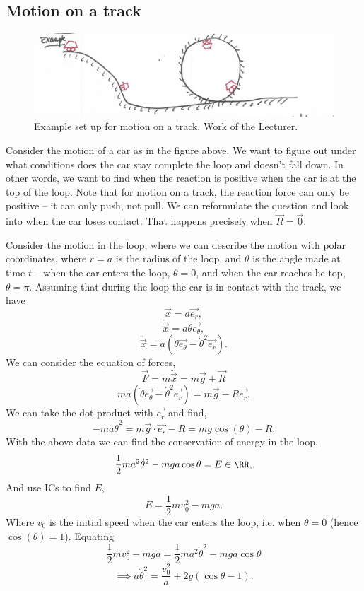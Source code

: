 \subsection{Motion on a track}
\begin{figure}[h]
  \centering
  \includegraphics[width=\textwidth]{media/lec9_example}
  \caption{Example set up for motion on a track. Work of the Lecturer.}
  \label{fig:lec9_track_example}
\end{figure}
Consider the motion of a car as in the figure above. We want to figure out under
what conditions does the car stay complete the loop and doesn't fall down. In
other words, we want to find when the reaction is positive when the car is at
the top of the loop. Note that for motion on a track, the reaction force can
only be positive -- it can only push, not pull. We can reformulate the question
and look into when the car loses contact. That happens precisely when
$\vec{R}=\vec{0}$.

Consider the motion in the loop, where we can describe the motion with polar
coordinates, where $r=a$ is the radius of the loop, and $\theta$ is the angle
made at time $t$ -- when the car enters the loop, $\theta=0$, and when the car
reaches he top, $\theta=\pi$. Assuming that during the loop the car is in
contact with the track, we have 
\[\vec{x}=a\vec{e_r},\]
\[\dot{\vec{x}}=a\dot{\theta}\vec{e_{\theta}},\]
\[\ddot{\vec{x}} = a(\ddot{\theta}\vec{e_{\theta}} - \dot{\theta}^2\vec{e_r}).\]
We can consider the equation of forces,
\[\vec{F}=m\ddot{\vec{x}} = m\vec{g}+\vec{R}\]
\[ma(\ddot{\theta}\vec{e_{\theta}} - \dot{\theta}^2\vec{e_r})=
m\vec{g}-R\vec{e_r}.\]
We can take the dot product with $\vec{e_r}$ and find, 
\[-ma\dot{\theta}^2 = m\vec{g}\cdot\vec{e_r} - R=mg\cos(\theta) - R.\]
With the above data we can find the conservation of energy in the loop,
\[\frac{1}{2}ma^2\dot{\theta}^2 - mga\cos\theta = E\in\RR,\]
And use ICs to find $E$,
\[E=\frac{1}{2}mv_0^2 - mga.\]
Where $v_0$ is the initial speed when the car enters the loop, i.e. when
$\theta=0$ (hence $\cos(\theta)=1$). Equating
\[\frac{1}{2}mv_0^2 - mga = \frac{1}{2}ma^2\dot{\theta}^2 - mga\cos\theta\]
\begin{equation}
  \implies a\dot{\theta}^2 = \frac{v_0^2}{a}+2g(\cos\theta - 1).
  \label{eqn:lec9_example_track_theta}
\end{equation}

